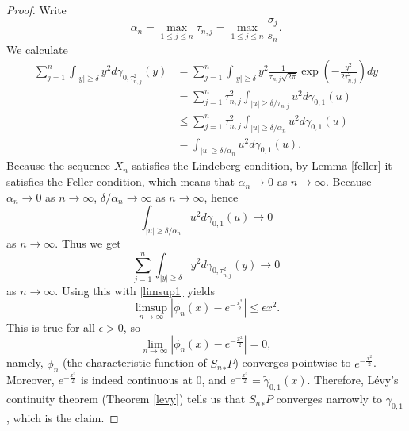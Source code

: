 \documentclass{article}
\theoremstyle{definition}
\begin{document}
\begin{proof}
Write
\[
\alpha_n = \max_{1 \leq j \leq n} \tau_{n,j} = \max_{1 \leq j \leq n} \frac{\sigma_j}{s_n}.
\]
We calculate
\begin{align*}
\sum_{j=1}^n \int_{|y| \geq \delta} y^2 d\gamma_{0,\tau_{n,j}^2}(y)&=\sum_{j=1}^n \int_{|y| \geq \delta}
y^2 \frac{1}{\tau_{n,j} \sqrt{2\pi}} \exp\left(-\frac{y^2}{2\tau_{n,j}^2} \right) dy\\
&=\sum_{j=1}^n  \tau_{n,j}^2 \int_{|u| \geq \delta/\tau_{n,j}}  u^2 d\gamma_{0,1}(u)\\
&\leq  \sum_{j=1}^n \tau_{n,j}^2 \int_{|u| \geq \delta/\alpha_n} u^2 d\gamma_{0,1}(u)\\
&=\int_{|u| \geq \delta/\alpha_n} u^2 d\gamma_{0,1}(u).
\end{align*}
Because the sequence $X_n$ satisfies the Lindeberg condition, by Lemma \ref{feller} it satisfies the Feller
condition, which means that $\alpha_n \to 0$ as $n \to \infty$. Because $\alpha_n \to 0$ as $n \to \infty$,
$\delta/\alpha_n \to \infty$ as $n \to \infty$, hence
\[
\int_{|u| \geq \delta/\alpha_n} u^2 d\gamma_{0,1}(u) \to 0
\]
as $n \to \infty$. Thus we get
\[
\sum_{j=1}^n \int_{|y| \geq \delta} y^2 d\gamma_{0,\tau_{n,j}^2}(y) \to 0
\]
as $n \to \infty$. Using this with \eqref{limsup1} yields
\[
\limsup_{n \to \infty} |\phi_n(x)-e^{-\frac{x^2}{2}}|  \leq \epsilon x^2.
\]
This is true for all $\epsilon>0$, so
\[
\lim_{n \to \infty}  |\phi_n(x)-e^{-\frac{x^2}{2}}|  = 0,
\]
namely, $\phi_n$ (the characteristic function of ${S_n}_*P$) converges pointwise to $e^{-\frac{x^2}{2}}$. Moreover, 
 $e^{-\frac{x^2}{2}}$ is indeed continuous at $0$, and
$e^{-\frac{x^2}{2}}=\tilde{\gamma}_{0,1}(x)$. Therefore, L\'evy's continuity theorem (Theorem \ref{levy})
tells us that ${S_n}_*P$ converges narrowly to $\gamma_{0,1}$, which is the claim.
\end{proof}
\end{document}
